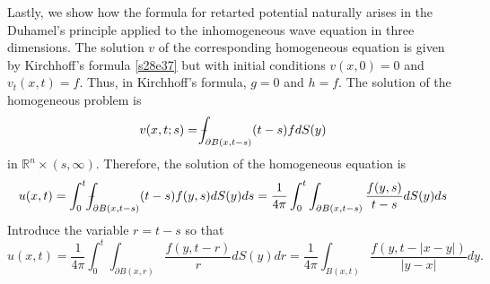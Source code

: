 \documentclass{article}
\newcommand{\fint}{\mbox{--}\mkern-16mu\int}
\theoremstyle{plain}
\numberwithin{thm}{section}
\theoremstyle{plain}
\numberwithin{prop}{section}
\theoremstyle{definition}
\numberwithin{defn}{section}
\theoremstyle{remark}
\numberwithin{equation}{section}
\begin{document}
Lastly, we show how the formula for retarted potential naturally arises in the Duhamel's principle applied to the
inhomogeneous wave equation in three dimensions. The solution $v$ of the corresponding homogeneous equation is
given by Kirchhoff's formula \eqref{s28e37} but with initial conditions $v(x, 0) = 0$ and $v_t(x,t) = f$. Thus,
in Kirchhoff's formula, $g = 0$ and $h = f$. The solution of the homogeneous problem is
\[
v(x,t;s)=\fint_{\partial B(x,t-s)}(t-s)fdS(y)
\]
in $\mathbb{R}^n \times (s,\infty)$. Therefore, the solution of the homogeneous equation is
\[
u(x,t) = \int_0^t\fint_{\partial B(x,t-s)}(t-s)f(y,s)dS(y)ds = 
\frac{1}{4\pi}\int_0^t\int_{\partial B(x,t-s)}\frac{f(y,s)}{t - s}dS(y)ds
\]
Introduce the variable $r = t - s$ so that
\[
u(x,t) = \frac{1}{4\pi}\int_0^t\int_{\partial B(x,r)}\frac{f(y, t-r)}{r}dS(y)dr
= \frac{1}{4\pi}\int_{B(x,t)}\frac{f(y, t - |x - y|)}{|y - x|}dy.
\]
\end{document}
